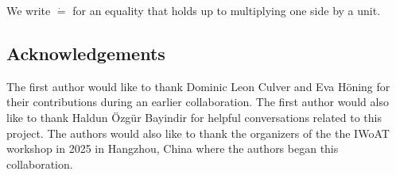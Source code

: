 We write $\dot{=}$ for an equality that holds up to multiplying one side by a unit. 

\subsection{Acknowledgements}
The first author would like to thank Dominic Leon Culver and Eva H\"oning for their contributions during an earlier collaboration. The first author would also like to thank Haldun \"Ozg\"ur Bayindir for helpful conversations related to this project. The authors would also like to thank the organizers of the the IWoAT workshop in 2025 in Hangzhou, China where the authors began this collaboration. 
